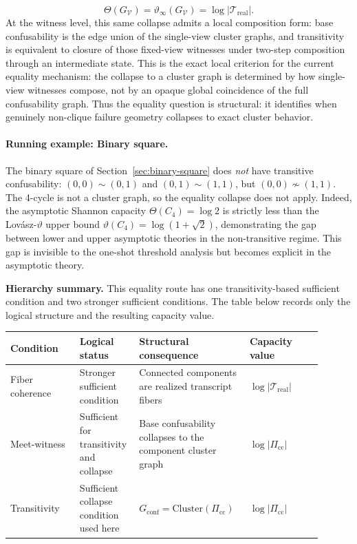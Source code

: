 \[
\Theta(G_{\mathcal V})=\vartheta_\infty(G_{\mathcal V})=\log |\mathcal T_{\mathrm{real}}|.
\]
At the witness level, this same collapse admits a local composition form: base confusability is the edge union of the single-view cluster graphs, and transitivity is equivalent to closure of those fixed-view witnesses under two-step composition through an intermediate state. This is the exact local criterion for the current equality mechanism: the collapse to a cluster graph is determined by how single-view witnesses compose, not by an opaque global coincidence of the full confusability graph. Thus the equality question is structural: it identifies when genuinely non-clique failure geometry collapses to exact cluster behavior.

\paragraph{Running example: Binary square.}
The binary square of Section~\ref{sec:binary-square} does \emph{not} have transitive confusability: $(0,0) \sim (0,1)$ and $(0,1) \sim (1,1)$, but $(0,0) \not\sim (1,1)$. The 4-cycle is not a cluster graph, so the equality collapse does not apply. Indeed, the asymptotic Shannon capacity $\Theta(C_4) = \log 2$ is strictly less than the Lovász-$\vartheta$ upper bound $\vartheta(C_4) = \log(1+\sqrt{2})$, demonstrating the gap between lower and upper asymptotic theories in the non-transitive regime. This gap is invisible to the one-shot threshold analysis but becomes explicit in the asymptotic theory.

\medskip
\noindent\textbf{Hierarchy summary.} This equality route has one transitivity-based sufficient condition and two stronger sufficient conditions. The table below records only the logical structure and the resulting capacity value.

\begingroup
\small
\setlength{\tabcolsep}{4pt}
\renewcommand{\arraystretch}{1.1}
\begin{center}
\begin{tabularx}{0.98\linewidth}{@{}>{\RaggedRight\arraybackslash}p{0.21\linewidth}>{\RaggedRight\arraybackslash}p{0.16\linewidth}>{\RaggedRight\arraybackslash}p{0.31\linewidth}>{\RaggedRight\arraybackslash}p{0.22\linewidth}@{}}
\toprule
\textbf{Condition} & \textbf{Logical status} & \textbf{Structural consequence} & \textbf{Capacity value} \\
\midrule
Fiber coherence & Stronger sufficient condition & Connected components are realized transcript fibers & $\log |\mathcal T_{\mathrm{real}}|$ \\
Meet-witness & Sufficient for transitivity and collapse & Base confusability collapses to the component cluster graph & $\log |\Pi_{\mathrm{cc}}|$ \\
Transitivity & Sufficient collapse condition used here & $G_{\mathrm{conf}}=\mathrm{Cluster}(\Pi_{\mathrm{cc}})$ & $\log |\Pi_{\mathrm{cc}}|$ \\
\bottomrule
\end{tabularx}
\end{center}
\endgroup
